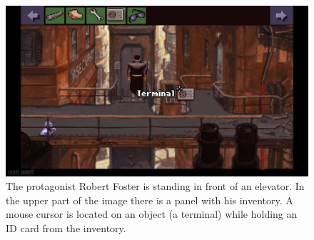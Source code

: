 \begin{figure}[H]
\centering
\includegraphics[width=1.\linewidth]{img/BaSS.png}
\caption{The protagonist Robert Foster is standing in front of an elevator. In the upper part of the image there is a panel with his inventory. A mouse cursor is located on an object (a terminal) while holding an ID card from the inventory.}
\label{fig:A-BaSS}
\end{figure}

